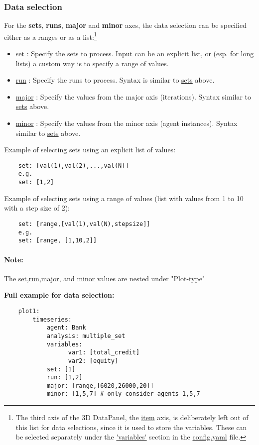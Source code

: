 \documentclass[10pt,a4paper]{article}
\begin{document}
\subsubsection*{Data selection}
For the \textbf{sets}, \textbf{runs}, \textbf{major} and \textbf{minor} axes, the data selection can be specified either as a ranges or as a list:\footnote{The third axis of the 3D DataPanel, the \url{item} axis, is deliberately left out of this list for data selections, since it is used to store the variables. These can be selected separately under the \url{'variables'} section in the \url{config.yaml} file.}
\begin{itemize}
\item \url{set} : Specify the sets to process. Input can be an explicit list, or (esp. for long lists) a custom way is to specify a range of values.

\item \url{run} : Specify the runs to process. Syntax is similar to \url{sets} above.

\item \url{major} : Specify the values from the major axis (iterations). Syntax similar to \url{sets} above.

\item \url{minor} : Specify the values from the minor axis (agent instances). Syntax similar to \url{sets} above.
\end{itemize}

Example of selecting sets using an explicit list of values:
\begin{lstlisting}
    set: [val(1),val(2),...,val(N)]
    e.g.
    set: [1,2]
\end{lstlisting}    
    
Example of selecting sets using a range of values (list with values from 1 to 10 with a step size of 2):
\begin{lstlisting}
    set: [range,[val(1),val(N),stepsize]]
    e.g.
    set: [range, [1,10,2]]
\end{lstlisting}  
\paragraph{Note:} The \url{set,run,major}, and \url{minor} values are nested under "Plot-type"

\bigskip
\textbf{Full example for data selection:}
\begin{lstlisting}
    plot1:
        timeseries:
            agent: Bank
            analysis: multiple_set
            variables: 
                  var1: [total_credit]  
                  var2: [equity]     
            set: [1]
            run: [1,2]
            major: [range,[6020,26000,20]]
            minor: [1,5,7] # only consider agents 1,5,7
\end{lstlisting}
\end{document}
